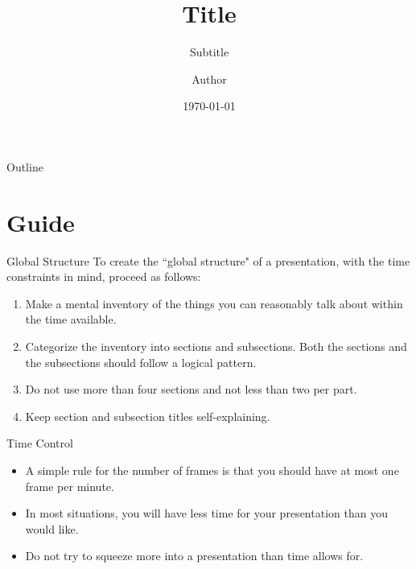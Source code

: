 \documentclass[compress,aspectratio=43]{beamer}
\title{Title}
\subtitle{Subtitle}
\author{Author}
\date{\today}
\institute{University of XXXX}
\begin{document}
\begin{frame}[plain]
    \titlepage
\end{frame}

\begin{frame}{Outline}
    \tableofcontents
\end{frame}

\section{Guide}

\begin{frame}{Global Structure}
    To create the ``global structure" of a presentation, with the time constraints in mind, proceed as follows:

    \medskip
    \begin{enumerate}
        \item Make a mental inventory of the things you can reasonably talk about within the time available.

        \item Categorize the inventory into sections and subsections. Both the sections and the subsections should follow a logical pattern.

        \item Do not use more than four sections and not less than two per part.

        \item Keep section and subsection titles self-explaining.
    \end{enumerate}

\end{frame}

\begin{frame}{Time Control}
    \begin{itemize}
        \item A simple rule for the number of frames is that you should have at most one frame per minute.

              \medskip
        \item In most situations, you will have less time for your presentation than you would like.

              \medskip
        \item Do not try to squeeze more into a presentation than time allows for.
    \end{itemize}
\end{frame}
\end{document}
